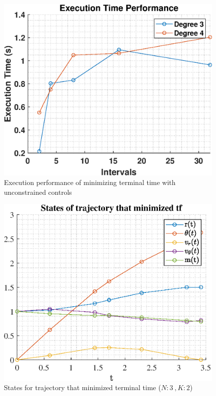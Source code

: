 \documentclass[]{article}
\begin{document}
    \begin{figure}
    	\centering
    	\includegraphics[scale=0.75]{runtime_c2_tf.eps}
    	\caption{Execution performance of minimizing terminal time with unconstrained controls}
    	\label{fig:runtime_c2_tf}
    \end{figure}
	\begin{figure}
		\centering
		\includegraphics[scale=0.75]{states_N3_K2_C2_tf.eps}
		\caption{States for trajectory that minimized terminal time (\(N:3\ , K:2\))}
		\label{fig:states_N3_K2_C2_tf}
	\end{figure}
\end{document}
